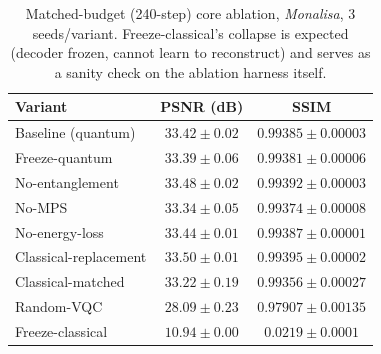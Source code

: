 \documentclass[11pt]{article}
\begin{document}
\begin{table}[H]
\centering
\caption{Matched-budget (240-step) core ablation, \textit{Monalisa}, 3 seeds/variant. Freeze-classical's collapse is expected (decoder frozen, cannot learn to reconstruct) and serves as a sanity check on the ablation harness itself.}
\label{tab:core_multiseed_240}
\scriptsize
\begin{tabular}{lcc}
\toprule
Variant & PSNR (dB) & SSIM \\
\midrule
Baseline (quantum) & $33.42\pm0.02$ & $0.99385\pm0.00003$ \\
Freeze-quantum & $33.39\pm0.06$ & $0.99381\pm0.00006$ \\
No-entanglement & $33.48\pm0.02$ & $0.99392\pm0.00003$ \\
No-MPS & $33.34\pm0.05$ & $0.99374\pm0.00008$ \\
No-energy-loss & $33.44\pm0.01$ & $0.99387\pm0.00001$ \\
Classical-replacement & $33.50\pm0.01$ & $0.99395\pm0.00002$ \\
Classical-matched & $33.22\pm0.19$ & $0.99356\pm0.00027$ \\
Random-VQC & $28.09\pm0.23$ & $0.97907\pm0.00135$ \\
Freeze-classical & $10.94\pm0.00$ & $0.0219\pm0.0001$ \\
\bottomrule
\end{tabular}
\end{table}
\end{document}
